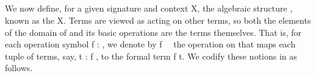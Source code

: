 \begin{code}
\AgdaSymbol{)}\AgdaSpace{}%
\AgdaSymbol{=}\AgdaSpace{}%
\AgdaSpace{}%
\AgdaSymbol{(}\AgdaSpace{}%
\AgdaSpace{}%
\AgdaSymbol{)}\<%
\\
%
\>[1]\AgdaSpace{}%
\AgdaSymbol{(}\AgdaSpace{}%
\AgdaSymbol{)}\AgdaSpace{}%
\AgdaSymbol{(}\AgdaSpace{}%
\AgdaSymbol{)}\AgdaSpace{}%
\AgdaSymbol{=}\AgdaSpace{}%
\AgdaSpace{}%
\AgdaSpace{}%
\AgdaSpace{}%
\AgdaSpace{}%
\AgdaSpace{}%
\AgdaSymbol{(}\AgdaSpace{}%
\AgdaSymbol{)}\AgdaSpace{}%
\AgdaSymbol{(}\AgdaSpace{}%
\AgdaSymbol{))}\<%
\\
%
\\[\AgdaEmptyExtraSkip]%
%
\>[1]%
\>[12]\AgdaSymbol{:}\AgdaSpace{}%
%
\>[29]\<%
\\
%
\>[1]\AgdaSpace{}%
\AgdaSymbol{=}\AgdaSpace{}%
\AgdaSpace{}%
\AgdaSymbol{\{}\AgdaSpace{}%
\AgdaSpace{}%
\AgdaSymbol{=}\AgdaSpace{}%
\AgdaSpace{}%
\AgdaSymbol{;}\AgdaSpace{}%
\AgdaSpace{}%
\AgdaSymbol{=}\AgdaSpace{}%
\AgdaSpace{}%
\AgdaSymbol{;}\AgdaSpace{}%
\AgdaSpace{}%
\AgdaSymbol{=}\AgdaSpace{}%
\AgdaSpace{}%
\AgdaSymbol{\}}\<%
\end{code}
\fi

We now define, for a given signature  and context \ab X,
the algebraic structure , known as the    \ab
X.  Terms are viewed as acting on other terms, so both the elements of the domain of 
and its basic operations are the terms themselves. That is, for each operation symbol \ab
f : , we denote by \ab f~~ the operation on  that maps
each tuple of terms, say, \ab t :  \ab f  , to the formal
term \ab f \ab t.
We codify these notions in \agda as follows.


